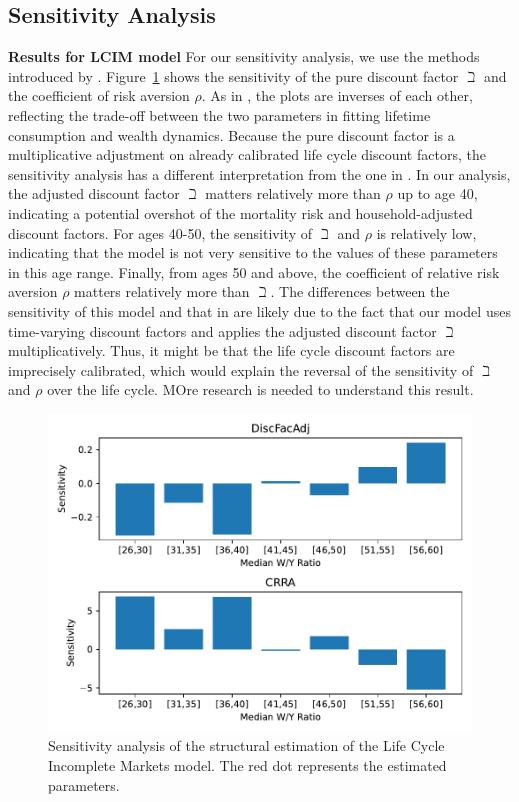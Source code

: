 \documentclass{article}
\newcommand{\CRRA}{\rho}
\begin{document}
\subsection{Sensitivity Analysis}\label{Sensitivity Analysis}

\textbf{Results for LCIM model} For our sensitivity analysis, we use the methods introduced by \cite{Andrews_2017}. Figure~\ref{fig:IndShockSensitivity} shows the sensitivity of the pure discount factor $\beth$ and the coefficient of risk aversion $\CRRA$. As in \cite{Andrews_2017}, the plots are inverses of each other, reflecting the trade-off between the two parameters in fitting lifetime consumption and wealth dynamics. Because the pure discount factor is a multiplicative adjustment on already calibrated life cycle discount factors, the sensitivity analysis has a different interpretation from the one in \cite{Gourinchas_2002}. In our analysis, the adjusted discount factor $\beth$ matters relatively more than $\CRRA$ up to age 40, indicating a potential overshot of the mortality risk and household-adjusted discount factors. For ages 40-50, the sensitivity of $\beth$ and $\CRRA$ is relatively low, indicating that the model is not very sensitive to the values of these parameters in this age range. Finally, from ages 50 and above, the coefficient of relative risk aversion $\CRRA$ matters relatively more than $\beth$. The differences between the sensitivity of this model and that in \cite{Gourinchas_2002} are likely due to the fact that our model uses time-varying discount factors and applies the adjusted discount factor $\beth$ multiplicatively. Thus, it might be that the life cycle discount factors are imprecisely calibrated, which would explain the reversal of the sensitivity of $\beth$ and $\CRRA$ over the life cycle. MOre research is needed to understand this result.

\begin{figure}[!htbp]
\centering
\includegraphics[width=0.7\linewidth]{files/IndShockSensitivity-9046783d8c17a2fc3e39f5fb5ebcf6c7.pdf}
\caption{Sensitivity analysis of the structural estimation of the Life Cycle Incomplete Markets model. The red dot represents the estimated parameters.}
\label{fig:IndShockSensitivity}
\end{figure}
\end{document}

